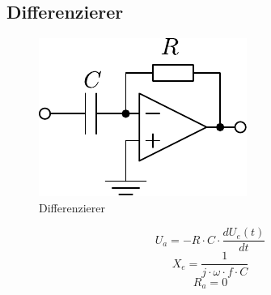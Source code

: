 



\subsection{Differenzierer}
\begin{figure}[h!]
	\centering
	\includegraphics[scale=\schscale]{op_diff.pdf}
	\caption{Differenzierer}
	\label{sch:op-diff}
\end{figure}
\[ U_a = - R \cdot C \cdot \frac{d U_e(t)}{dt} \]
\[ X_e = \frac{1}{j \cdot \omega \cdot f \cdot C} \]
\[ R_a = 0 \]